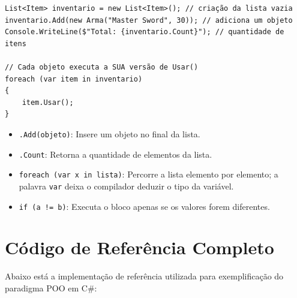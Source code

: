 \begin{lstlisting}[style=csharp]
List<Item> inventario = new List<Item>(); // criação da lista vazia
inventario.Add(new Arma("Master Sword", 30)); // adiciona um objeto
Console.WriteLine($"Total: {inventario.Count}"); // quantidade de itens

// Cada objeto executa a SUA versão de Usar()
foreach (var item in inventario)
{
    item.Usar();
}
\end{lstlisting}

\begin{itemize}
    \item \texttt{.Add(objeto)}: Insere um objeto no final da lista.
    \item \texttt{.Count}: Retorna a quantidade de elementos da lista.
    \item \texttt{foreach (var x in lista)}: Percorre a lista elemento por elemento; a
    palavra \texttt{var} deixa o compilador deduzir o tipo da variável.
    \item \texttt{if (a != b)}: Executa o bloco apenas se os valores forem diferentes.
\end{itemize}

\section{Código de Referência Completo}

Abaixo está a implementação de referência utilizada para exemplificação do paradigma POO em
C\#:

